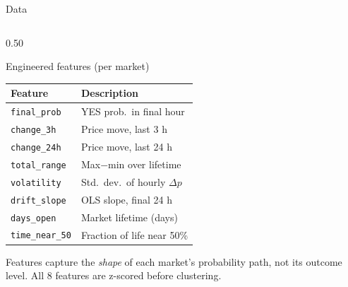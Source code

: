 \documentclass[10pt, aspectratio=169]{beamer}
\begin{document}
\begin{frame}{Data}
\begin{columns}[T]
    \begin{column}{0.50\textwidth}
      \begin{block}{Engineered features (per market)}
        \footnotesize
        \begin{tabular}{@{}ll@{}}
          \toprule
          Feature & Description \\
          \midrule
          \texttt{final\_prob} & YES prob.\ in final hour \\
          \texttt{change\_3h} & Price move, last 3 h \\
          \texttt{change\_24h} & Price move, last 24 h \\
          \texttt{total\_range} & Max$-$min over lifetime \\
          \texttt{volatility} & Std.\ dev.\ of hourly $\Delta p$ \\
          \texttt{drift\_slope} & OLS slope, final 24 h \\
          \texttt{days\_open} & Market lifetime (days) \\
          \texttt{time\_near\_50} & Fraction of life near 50\% \\
          \bottomrule
        \end{tabular}

        \medskip
        Features capture the \emph{shape} of each market's
        probability path, not its outcome level.
        All 8 features are z-scored before clustering.
      \end{block}
    \end{column}
  \end{columns}
\end{frame}
\end{document}
